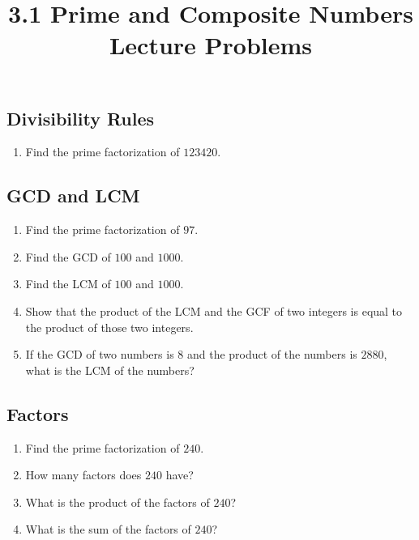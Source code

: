 \documentclass{article}
\title{3.1 Prime and Composite Numbers Lecture Problems}
\author{}
\date{}
\begin{document}
\maketitle

\subsection*{Divisibility Rules}
\begin{enumerate}
    \item Find the prime factorization of $123420$.
        \vspace{3cm}
\end{enumerate}

\subsection*{GCD and LCM}
\begin{enumerate}[resume]
    \item Find the prime factorization of $97$.
        \vspace{3cm}
    \item Find the GCD of $100$ and $1000$.
        \vspace{3cm}
    \item Find the LCM of $100$ and $1000$.
        \vspace{3cm}
    \item Show that the product of the LCM and the GCF of two integers is equal to the product of those two integers.
        \vspace{3cm}
    \item If the GCD of two numbers is $8$ and the product of the numbers is $2880$, what is the LCM of the numbers?
        \vspace{3cm}
\end{enumerate}

\subsection*{Factors}
\begin{enumerate}[resume]
    \item Find the prime factorization of $240$.
        \vspace{3cm}
    \item How many factors does $240$ have?
        \vspace{3cm}
    \item What is the product of the factors of $240$?
        \vspace{3cm}
    \item What is the sum of the factors of $240$?
        \vspace{3cm}
\end{enumerate}
\end{document}
